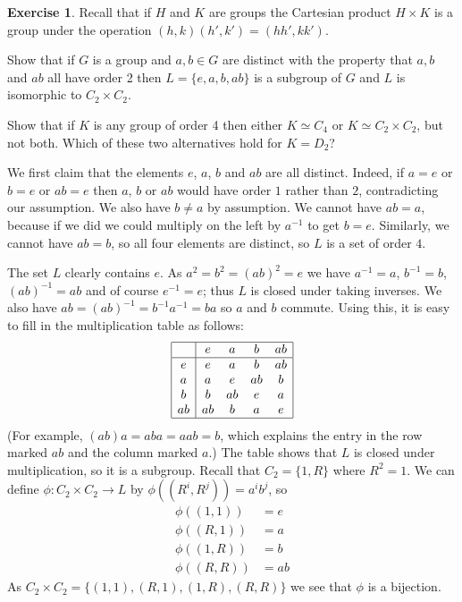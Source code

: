\documentclass{amsart}
\newcommand{\xra}{\xrightarrow}
\renewcommand{\:}{\colon}
\newcommand{\tm}{\times}
\theoremstyle{definition}
\newtheorem{exercise}{Exercise}
\newenvironment{solution}{{\noindent\bf Solution:}}{}
\begin{document}
\begin{exercise}
 Recall that if $H$ and $K$ are groups the Cartesian product $H\tm K$
 is a group under the operation $(h,k)(h',k')=(hh',kk')$.

 Show that if $G$ is a group and $a,b\in G$ are distinct with the
 property that $a,b$ and $ab$ all have order 2 then $L=\{e,a,b,ab\}$ is
 a subgroup of $G$ and $L$ is isomorphic to $C_2\tm C_2$.

 Show that if $K$ is any group of order 4 then either $K\simeq C_4$ or
 $K\simeq C_2\tm C_2$, but not both.  Which of these two alternatives
 hold for $K=D_2$?
\end{exercise}
\begin{solution}
 We first claim that the elements $e$, $a$, $b$ and $ab$ are all
 distinct.  Indeed, if $a=e$ or $b=e$ or $ab=e$ then $a$, $b$ or $ab$
 would have order $1$ rather than $2$, contradicting our assumption.
 We also have $b\neq a$ by assumption.  We cannot have $ab=a$, because
 if we did we could multiply on the left by $a^{-1}$ to get $b=e$.
 Similarly, we cannot have $ab=b$, so all four elements are distinct,
 so $L$ is a set of order $4$.

 The set $L$ clearly contains $e$.  As $a^2=b^2=(ab)^2=e$ we have
 $a^{-1}=a$, $b^{-1}=b$, $(ab)^{-1}=ab$ and of course $e^{-1}=e$; thus
 $L$ is closed under taking inverses.  We also have
 $ab=(ab)^{-1}=b^{-1}a^{-1}=ba$ so $a$ and $b$ commute.  Using this,
 it is easy to fill in the multiplication table as follows:
 \[ \begin{array}{|c|cccc|}
  \hline
      & e  & a  & b  & ab \\ \hline
   e  & e  & a  & b  & ab \\ 
   a  & a  & e  & ab & b  \\ 
   b  & b  & ab & e  & a  \\ 
   ab & ab & b  & a  & e  \\ \hline
 \end{array} \]
 (For example, $(ab)a=aba=aab=b$, which explains the entry in the row
 marked $ab$ and the column marked $a$.)  The table shows that $L$ is
 closed under multiplication, so it is a subgroup.  Recall that
 $C_2=\{1,R\}$ where $R^2=1$.  We can define $\phi\:C_2\tm C_2\xra{}L$
 by $\phi((R^i,R^j))=a^ib^j$, so
 \begin{align*}
  \phi((1,1)) &= e \\
  \phi((R,1)) &= a \\
  \phi((1,R)) &= b \\
  \phi((R,R)) &= ab 
 \end{align*}
 As $C_2\tm C_2=\{(1,1),(R,1),(1,R),(R,R)\}$ we see that $\phi$ is a
 bijection. 


\end{solution}
\end{document}
